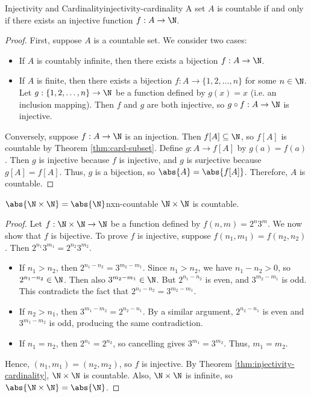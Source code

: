 \begin{thmbox}{Injectivity and Cardinality}{injectivity-cardinality}
    A set $A$ is countable if and only if there exists an injective function $f : A \to \N$.
    \tcblower
    \begin{proof}
        First, suppose $A$ is a countable set. We consider two cases:
        \begin{itemize}
            \item If $A$ is countably infinite, then there exists a bijection $f : A \to \N$.
            \item If $A$ is finite, then there exists a bijection $f : A \to \{1,2,\ldots,n\}$ for some $n \in \N$. Let $g : \{1,2,\ldots,n\} \to \N$ be a function defined by $g(x) = x$ (i.e. an inclusion mapping). Then $f$ and $g$ are both injective, so $g \circ f : A \to \N $ is injective.
        \end{itemize}

        Conversely, suppose $f : A \to \N$ is an injection. Then $f[A] \subseteq \N$, so $f[A]$ is countable by Theorem \ref{thm:card-subset}. Define $g : A \to f[A]$ by $g(a) = f(a)$. Then $g$ is injective because $f$ is injective, and $g$ is surjective because $g[A] = f[A]$. Thus, $g$ is a bijection, so $\abs{A} = \abs{f[A]}$. Therefore, $A$ is countable.
    \end{proof}
\end{thmbox}

\begin{thmbox}{$\abs{\N \times \N} = \abs{\N}$}{nxn-countable}
    $\N \times \N$ is countable.
    \tcblower
    \begin{proof}
        Let $f : \N \times \N \to \N$ be a function defined by $f(n,m) = 2^n 3^m$. We now show that $f$ is bijective. To prove $f$ is injective, suppose $f(n_1, m_1) = f(n_2, n_2)$. Then $2^{n_1} 3^{m_1} = 2^{n_2} 3^{m_2}$.
        \begin{itemize}
            \item If $n_1 > n_2$, then $2^{n_1 - n_2} = 3^{m_2 - m_1}$. Since $n_1 > n_2$, we have $n_1 - n_2 > 0$, so $2^{n_1 - n_2} \in \N$. Then also $3^{m_2 - m_1} \in \N$. But $2^{n_1 - n_2}$ is even, and $3^{m_2 - m_1}$ is odd. This contradicts the fact that $2^{n_1 - n_2} = 3^{m_2 - m_1}$.
            \item If $n_2 > n_1$, then $3^{m_1 - m_2} = 2^{n_2 - n_1}$. By a similar argument, $2^{n_2 - n_1}$ is even and $3^{m_1 - m_2}$ is odd, producing the same contradiction.
            \item If $n_1 = n_2$, then $2^{n_1} = 2^{n_2}$, so cancelling gives $3^{m_1} = 3^{m_2}$. Thus, $m_1 = m_2$.
        \end{itemize}
        Hence, $(n_1, m_1) = (n_2, m_2)$, so $f$ is injective.
        By Theorem \ref{thm:injectivity-cardinality}, $\N \times \N$ is countable. Also, $\N \times \N$ is infinite, so $\abs{\N \times \N} = \abs{\N}$.
    \end{proof}
\end{thmbox}

